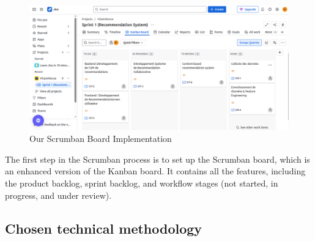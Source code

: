 \begin{center}
\begin{figure}[H]
            \centering
            \includegraphics[scale=0.38]{images/kanbanBoard.png}
            \caption{Our Scrumban Board Implementation}
            \label{fig:Tableau_Scrumban}
\end{figure}
\end{center}

The first step in the Scrumban process is to set up the Scrumban board, which is an enhanced version of the Kanban board. It contains all the features, including the product backlog, sprint backlog, and workflow stages (not started, in progress, and under review).

\subsection{Chosen technical methodology}

